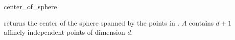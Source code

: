 \ccHtmlNoRefLinks
\begin{ccRefFunction}{center_of_sphere}
\ccHtmlNoLinks

{returns the center of the sphere spanned by the points in
\ccc{A = tuple[first,last)}.
\ccPrecond $A$ contains $d+1$ affinely independent points of
dimension $d$.}

\end{ccRefFunction}

